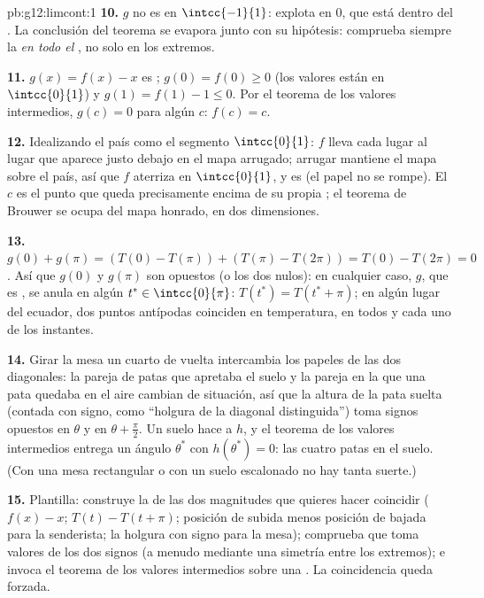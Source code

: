 \begin{solution}{pb:g12:limcont:1}
\textbf{10.} $g$ no es  en $\intcc{-1}{1}$: explota en $0$, que
está dentro del . La conclusión del teorema se evapora junto con
su hipótesis: comprueba siempre la  \emph{en todo el
}, no solo en los extremos.

\textbf{11.} $g(x) = f(x) - x$ es ; $g(0) = f(0) \geq 0$ (los
valores están en $\intcc{0}{1}$) y $g(1) = f(1) - 1 \leq 0$. Por el
teorema de los valores intermedios, $g(c) = 0$ para algún $c$:
$f(c) = c$.

\textbf{12.} Idealizando el país como el segmento $\intcc{0}{1}$: $f$
lleva cada lugar al lugar que aparece justo debajo en el mapa arrugado;
arrugar mantiene el mapa sobre el país, así que $f$ aterriza en
$\intcc{0}{1}$, y es  (el papel no se rompe). El  $c$ es
el punto que queda precisamente encima de su propia ; el teorema de
Brouwer se ocupa del mapa honrado, en dos dimensiones.

\textbf{13.} $g(0) + g(\pi) = \left(T(0) - T(\pi)\right) +
\left(T(\pi) - T(2\pi)\right) = T(0) - T(2\pi) = 0$. Así que $g(0)$ y
$g(\pi)$ son opuestos (o los dos nulos): en cualquier caso, $g$, que es
, se anula en algún $t^* \in \intcc{0}{\pi}$:
$T(t^*) = T(t^* + \pi)$; en algún lugar del ecuador, dos puntos antípodas
coinciden en temperatura, en todos y cada uno de los instantes.

\textbf{14.} Girar la mesa un cuarto de vuelta intercambia los papeles de
las dos diagonales: la pareja de patas que apretaba el suelo y la pareja
en la que una pata quedaba en el aire cambian de situación, así que la
altura de la pata suelta (contada con signo, como ``holgura de la diagonal
distinguida'') toma signos opuestos en $\theta$ y en
$\theta + \frac\pi2$. Un suelo  hace  a $h$, y el teorema
de los valores intermedios entrega un ángulo $\theta^*$ con
$h(\theta^*) = 0$: las cuatro patas en el suelo. (Con una mesa rectangular
o con un suelo escalonado no hay tanta suerte.)

\textbf{15.} Plantilla: construye la \emph{} de las dos
magnitudes que quieres hacer coincidir ($f(x) - x$; $T(t) - T(t + \pi)$;
posición de subida menos posición de bajada para la senderista; la holgura
con signo para la mesa); comprueba que toma valores de los dos signos (a
menudo mediante una simetría entre los extremos); e invoca el teorema de
los valores intermedios sobre una  . La coincidencia queda
forzada.


\end{solution}

